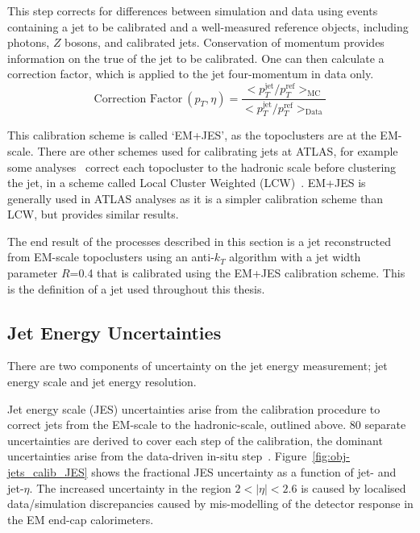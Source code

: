 \begin{enumerate}[leftmargin=*]
  This step corrects for differences between simulation and data using events
  containing a jet to be calibrated and a well-measured reference objects, including photons, $Z$ bosons, and calibrated jets.
  Conservation of momentum provides information on the true \pT{} of the jet to be calibrated.
  One can then calculate a correction factor, which is applied to the jet four-momentum in data only.
  \begin{equation}
    \text{Correction Factor}~(p_T, \eta) = \frac{ < p_T^{\text{jet}}/p_T^{\text{ref}}>_{\text{MC}} }{ < p_T^{\text{jet}}/p_T^{\text{ref}}>_{\text{Data}} }
  \end{equation}
\end{enumerate}

This calibration scheme is called `EM+JES', as the topoclusters are at the EM-scale.
There are other schemes used for calibrating jets at ATLAS,
for example some analyses~\cite{obj-VVjj} correct each topocluster to the hadronic scale
before clustering the jet, in a scheme called Local Cluster Weighted (LCW)~\cite{obj-jets_topo}.
EM+JES is generally used in ATLAS analyses as it is a simpler calibration scheme than LCW, but provides similar results.

The end result of the processes described in this section is a jet
reconstructed from EM-scale topoclusters using an anti-$k_T$ algorithm with a jet width parameter $R$=0.4
that is calibrated using the EM+JES calibration scheme.
This is the definition of a jet used throughout this thesis.

\newpage

\subsection{Jet Energy Uncertainties}
\label{sec:obj-jets_uncert}

There are two components of uncertainty on the jet energy measurement; jet energy scale and jet energy resolution.

Jet energy scale (JES) uncertainties arise from the calibration procedure
to correct jets from the EM-scale to the hadronic-scale, outlined above.
80 separate uncertainties are derived to cover each step of the calibration,
the dominant uncertainties arise from the data-driven in-situ step~\cite{obj-jets_calib_run2}.
Figure~\ref{fig:obj-jets_calib_JES} shows the fractional JES uncertainty as a function of jet-\pT{} and jet-$\eta$.
The increased uncertainty in the region $2 < |\eta| < 2.6$ is caused by localised data/simulation discrepancies
caused by mis-modelling of the detector response in the EM end-cap calorimeters.



